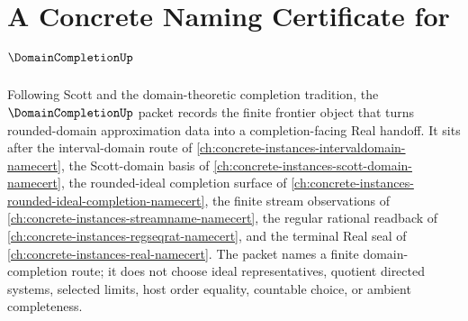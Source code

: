 \chapter{A Concrete Naming Certificate for $\DomainCompletionUp$}
\label{ch:concrete-instances-domain-completion-namecert}

Following Scott and the domain-theoretic completion tradition, the $\DomainCompletionUp$ packet records the finite frontier object that turns rounded-domain approximation data into a completion-facing Real handoff. It sits after the interval-domain route of \autoref{ch:concrete-instances-intervaldomain-namecert}, the Scott-domain basis of \autoref{ch:concrete-instances-scott-domain-namecert}, the rounded-ideal completion surface of \autoref{ch:concrete-instances-rounded-ideal-completion-namecert}, the finite stream observations of \autoref{ch:concrete-instances-streamname-namecert}, the regular rational readback of \autoref{ch:concrete-instances-regseqrat-namecert}, and the terminal Real seal of \autoref{ch:concrete-instances-real-namecert}. The packet names a finite domain-completion route; it does not choose ideal representatives, quotient directed systems, selected limits, host order equality, countable choice, or ambient completeness.

